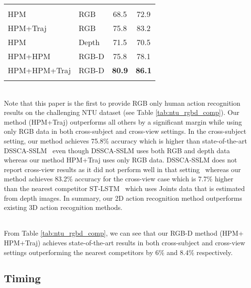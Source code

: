 \documentclass[twocolumn]{svjour3}          \smartqed  \usepackage{graphicx}
\begin{document}
\begin{table*}
{\begin{tabular}{llcc}
\noalign{\smallskip}\hline\noalign{\smallskip}
\multicolumn{ 3}{c}{\textbf{Proposed}} & \multicolumn{1}{l}{} \\ \noalign{\smallskip}\hline\noalign{\smallskip}

HPM & RGB & 68.5 & 72.9 \\ HPM+Traj & RGB & 75.8 & 83.2 \\ HPM & Depth & 71.5 & 70.5 \\ HPM+HPM & RGB-D & 75.8 & 78.1 \\ HPM+HPM+Traj & RGB-D & \bf{80.9} & \bf{86.1} \\ 

\hline\noalign{\smallskip}
\end{tabular}
}
\end{table*}


\vspace{2mm}
\\
Note that this paper is the first to provide RGB only human action recognition results on the challenging NTU dataset (see Table \ref{tab:ntu_rgbd_comp}). Our method (HPM+Traj) outperforms all others by a significant margin while using only RGB data in both cross-subject and cross-view settings. In the cross-subject setting, our method achieves 75.8\% accuracy which is higher than state-of-the-art DSSCA-SSLM~\citep{shahroudy2017deep} even though DSSCA-SSLM uses both RGB and depth data whereas our method HPM+Traj uses only RGB data. DSSCA-SSLM does not report cross-view results as it did not perform well in that setting~\citep{shahroudy2017deep} whereas our method achieves 83.2\% accuracy for the cross-view case which is 7.7\% higher than the nearest competitor ST-LSTM~\citep{liu2016spatio} which uses Joints data that is estimated from depth images. In summary, our 2D action recognition method outperforms existing 3D action recognition methods.


\vspace{2mm}
\\
From Table \ref{tab:ntu_rgbd_comp}, we can see that our RGB-D method (HPM+ HPM+Traj) achieves state-of-the-art results in both cross-subject and cross-view settings outperforming the nearest competitors by 6\% and 8.4\% respectively.








\subsection{Timing}
\end{document}
